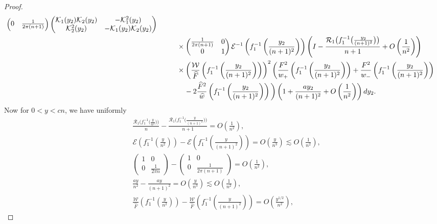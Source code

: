 \documentclass[11pt]{article}
\numberwithin{equation}{section}
\newcommand{\Id}{I}
\newcommand{\cK}{\mathcal{K}}
\newcommand{\cE}{\mathcal{E}}
\newcommand{\cR}{\mathcal{R}}
\newcommand{\cW}{\mathcal{W}}
\newcommand{\hw}{\widehat w}
\newcommand{\hF}{\widehat F}
\newcommand{\hFw}{\frac{\hF^2}{\hw}}
\numberwithin{equation}{section}
\begin{document}
\begin{proof}
\begin{align}
\begin{pmatrix}
 0 & \frac{1}{2\pi (n+1)}
 \end{pmatrix}
 \begin{pmatrix}
 \cK_1(y_2)\cK_2(y_2) & -\cK^2_1(y_2)
 \\
 \cK^2_2(y_2) & -\cK_1(y_2)\cK_2(y_2)
 \end{pmatrix}
\nonumber
 \\
 &\phantom{\qquad=}{}\times \begin{pmatrix}
 \frac{1}{2\pi (n+1)} & 0
 \\
 0 & 1
 \end{pmatrix}
\cE^{-1}\left(f_1^{-1}\left(\frac{y_2}{(n+1)^2}\right)\right)\left( \Id - \frac{\cR_1\big(f_1^{-1}\big(\frac{y_2}{(n+1)^2}\big)\big)}{n+1}+ O\left( \frac{1}{n^2} \right)\right)\nonumber
 \\
 &\phantom{\qquad=}{}\times
 \left(\frac{\cW}{\hF}\left(f_1^{-1}\left(\frac{y_2}{(n+1)^2}\right)\right)\right)^2\bigg(\frac{F^2}{w_+}\left(f_1^{-1}\left(\frac{y_2}{(n+1)^2}\right)\right)+\frac{F^2}{w_-}\left(f_1^{-1}\left(\frac{y_2}{(n+1)^2}\right)\right)
\nonumber \\
 &\phantom{\qquad=\times}{}-2\hFw\left(f_1^{-1}\left(\frac{y_2}{(n+1)^2}\right)\right)\bigg) \left(1 + \frac{ay_2}{(n+1)^2} + O\left(\frac{1}{n^2}\right)\right){\rm d}y_2.\label{LongExp2}
 \end{align}
Now for $0< y < cn$, we have uniformly
\begin{align*}
& \frac{\cR_1\big(f_1^{-1}\big(\frac{y}{n^2}\big)\big)}{n} - \frac{\cR_1\big(f_1^{-1}\big(\frac{y}{(n+1)^2}\big)\big)}{n+1}= O\left(\frac{1}{n^2}\right),
 \\
& \cE\left(f_1^{-1}\left(\frac{y}{n^2}\right)\right) - \cE\left(f_1^{-1}\left(\frac{y}{(n+1)^2}\right)\right)= O\left(\frac{y}{n^3}\right) \lesssim O\left(\frac{1}{n^2}\right),
 \\
& \begin{pmatrix}
 1 & 0
 \\
 0 & \frac{1}{2\pi n}
 \end{pmatrix} - \begin{pmatrix}
 1 & 0
 \\
 0 & \frac{1}{2\pi (n+1)}
 \end{pmatrix}= O\left(\frac{1}{n^2}\right),
 \\
 &\frac{ay}{n^2}-\frac{ay}{(n+1)^2}= O\left( \frac{y}{n^3}\right) \lesssim O\left(\frac{1}{n^2}\right),
 \\
& \frac{\cW}{\hF}\left(f_1^{-1}\left(\frac{y}{n^2}\right)\right) - \frac{\cW}{\hF}\left(f_1^{-1}\left(\frac{y}{(n+1)^2}\right)\right)= O\left(\frac{y^{1/2}}{n^2}\right),

\end{align*}
\end{proof}
\end{document}

